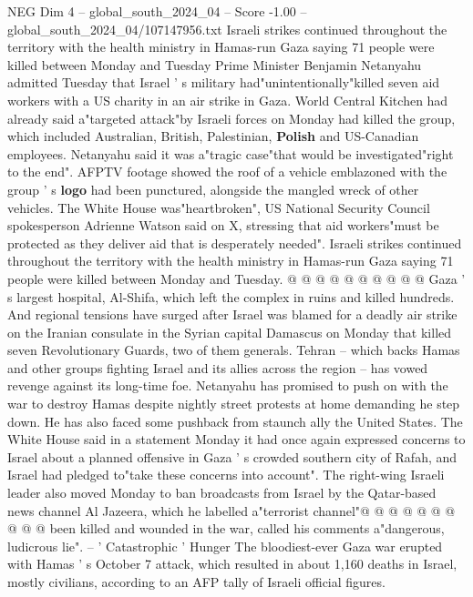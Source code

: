 \begin{textsample}{NEG Dim 4 – global\_south\_2024\_04 – Score -1.00 – global\_south\_2024\_04/107147956.txt}  \label{ex:f4_neg_192}
Israeli strikes continued throughout the territory with the health ministry in Hamas-run Gaza saying 71 people were killed between Monday and Tuesday Prime Minister Benjamin Netanyahu admitted Tuesday that Israel ' s military had"unintentionally"killed seven aid workers with a US charity in an air strike in Gaza.
World Central Kitchen had already said a"targeted attack"by Israeli forces on Monday had killed the group, which included Australian, British, Palestinian, \textbf{Polish} and US-Canadian employees.
Netanyahu said it was a"tragic case"that would be investigated"right to the end".
AFPTV footage showed the roof of a vehicle emblazoned with the group ' s \textbf{logo} had been punctured, alongside the mangled wreck of other vehicles.
The White House was"heartbroken", US National Security Council spokesperson Adrienne Watson said on X, stressing that aid workers"must be protected as they deliver aid that is desperately needed".
Israeli strikes continued throughout the territory with the health ministry in Hamas-run Gaza saying 71 people were killed between Monday and Tuesday. @ @ @ @ @ @ @ @ @ @ Gaza ' s largest hospital, Al-Shifa, which left the complex in ruins and killed hundreds.
And regional tensions have surged after Israel was blamed for a deadly air strike on the Iranian consulate in the Syrian capital Damascus on Monday that killed seven Revolutionary Guards, two of them generals.
Tehran -- which backs Hamas and other groups fighting Israel and its allies across the region -- has vowed revenge against its long-time foe.
Netanyahu has promised to push on with the war to destroy Hamas despite nightly street protests at home demanding he step down.
He has also faced some pushback from staunch ally the United States.
The White House said in a statement Monday it had once again expressed concerns to Israel about a planned offensive in Gaza ' s crowded southern city of Rafah, and Israel had pledged to"take these concerns into account".
The right-wing Israeli leader also moved Monday to ban broadcasts from Israel by the Qatar-based news channel Al Jazeera, which he labelled a"terrorist channel"@ @ @ @ @ @ @ @ @ @ been killed and wounded in the war, called his comments a"dangerous, ludicrous lie". -- ' Catastrophic ' Hunger The bloodiest-ever Gaza war erupted with Hamas ' s October 7 attack, which resulted in about 1,160 deaths in Israel, mostly civilians, according to an AFP tally of Israeli official figures.

\end{textsample}
